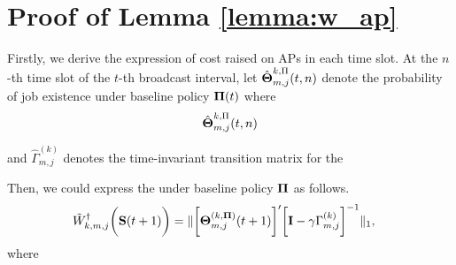 \appendices
\section{ Proof of Lemma \ref{lemma:w_ap} }
\label{append_1}
Firstly, we derive the expression of cost raised on APs in each time slot.
At the $n$-th time slot of the $t$-th broadcast interval, let $\hat{\boldsymbol{\Theta}}^{k,\Pi}_{m,j}(t,n)$ denote the probability of job existence under baseline policy $\boldsymbol{\Pi}(t)$ where
\begin{align}
    \hat{\boldsymbol{\Theta}}^{k,\Pi}_{m,j}(t,n)
\end{align}

and $\hat{\Gamma}^{(k)}_{m,j}$ denotes the time-invariant transition matrix for the

Then, we could express the  under baseline policy $\boldsymbol{\Pi}$ as follows.
\begin{align}
    &\tilde{W}^{\dagger}_{k,m,j}\bigg(\mathbf{S}(t+1)\bigg) =
    \lVert
        \bigg[
            \boldsymbol{\Theta}^{(k, \boldsymbol{\Pi})}_{m,j}(t+1)
        \bigg]'
        \bigg[
            \mathbf{I} - \gamma \Gamma^{(k)}_{m,j}
        \bigg]^{-1}
    \|_1,
    \label{w_ap}
\end{align}
where

